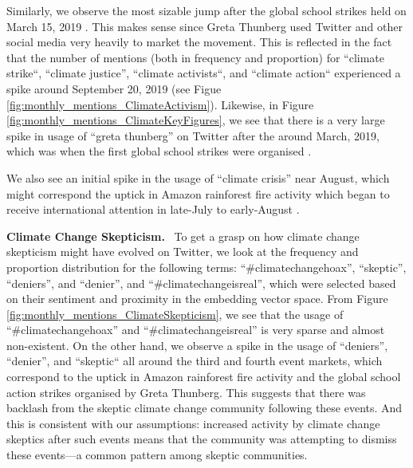 \documentclass{paper}
\newcommand{\inlineSection}[1]{\vspace{0.5em}\noindent\textbf{#1.}~}
\begin{document}
Similarly, we observe the most sizable jump after the global school strikes held on March 15, 2019 \cite{wiki:greta_climate_strikes}. This makes sense since Greta Thunberg used Twitter and other social media very heavily to market the movement. This is reflected in the fact that the number of mentions (both in frequency and proportion) for ``climate strike``, ``climate justice'', ``climate activists``, and ``climate action`` experienced a spike around September 20, 2019 (see Figue \ref{fig:monthly_mentions_ClimateActivism}). Likewise, in Figure \ref{fig:monthly_mentions_ClimateKeyFigures}, we see that there is a very large spike in usage of ``greta thunberg'' on Twitter after the around March, 2019, which was when the first global school strikes were organised \cite{wiki:greta_climate_strikes}.

We also see an initial spike in the usage of ``climate crisis'' near August, which might correspond the uptick in Amazon rainforest fire activity which began to receive international attention in late-July to early-August \cite{nasa:climate_change_consensus}.

\inlineSection{Climate Change Skepticism} To get a grasp on how climate change skepticism might have evolved on Twitter, we look at the frequency and proportion distribution for the following terms: ``\#climatechangehoax'', ``skeptic'', ``deniers'', and ``denier'', and ``\#climatechangeisreal'', which were selected based on their sentiment and proximity in the embedding vector space. From Figure \ref{fig:monthly_mentions_ClimateSkepticism}, we see that the usage of ``\#climatechangehoax'' and ``\#climatechangeisreal'' is very sparse and almost non-existent. On the other hand, we observe a spike in the usage of ``deniers'', ``denier'', and ``skeptic`` all around the third and fourth event markets, which correspond to the uptick in Amazon rainforest fire activity and the global school action strikes organised by Greta Thunberg. This suggests that there was backlash from the skeptic climate change community following these events. And this is consistent with our assumptions: increased activity by climate change skeptics after such events means that the community was attempting to dismiss these events---a common pattern among skeptic communities.
\end{document}
